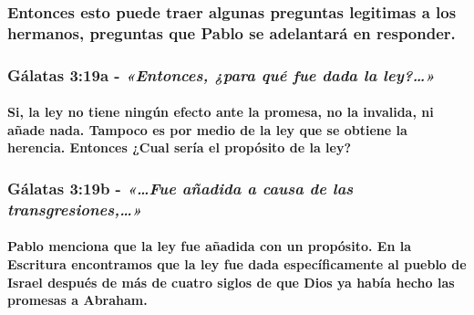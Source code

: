 \documentclass[11a pt,twoside]{article}
\newcommand{\scripture}[1]{%
  {\fontsize{12pt}{16pt}\selectfont\ScriptureFont\itshape #1}%
}
\let\oldsubsubsection\subsubsection
\renewcommand{\subsubsection}{\needspace{4\baselineskip}\oldsubsubsection}
\let\oldparagraph\paragraph
\renewcommand{\paragraph}{\needspace{3\baselineskip}\oldparagraph}
\begin{document}
\subsubsection{Entonces esto puede traer algunas preguntas legitimas a
los hermanos, preguntas que Pablo se adelantará en
responder.}\label{entonces-esto-puede-traer-algunas-preguntas-legitimas-a-los-hermanos-preguntas-que-pablo-se-adelantaruxe1-en-responder.}

\subsubsection{\texorpdfstring{Gálatas 3:19a -
\scripture{«Entonces, ¿para qué fue dada la ley?…»}}{Gálatas 3:19a - }}\label{guxe1latas-319a---entonces-para-quuxe9-fue-dada-la-ley}

\paragraph{Si, la ley no tiene ningún efecto ante la promesa, no la
invalida, ni añade nada. Tampoco es por medio de la ley que se obtiene
la herencia. Entonces ¿Cual sería el propósito de la
ley?}\label{si-la-ley-no-tiene-ninguxfan-efecto-ante-la-promesa-no-la-invalida-ni-auxf1ade-nada.-tampoco-es-por-medio-de-la-ley-que-se-obtiene-la-herencia.-entonces-cual-seruxeda-el-propuxf3sito-de-la-ley}

\subsubsection{\texorpdfstring{Gálatas 3:19b -
\scripture{«…Fue añadida a causa de las transgresiones,…»}}{Gálatas 3:19b - }}\label{guxe1latas-319b---fue-auxf1adida-a-causa-de-las-transgresiones}

\paragraph{Pablo menciona que la ley fue añadida con un propósito. En la
Escritura encontramos que la ley fue dada específicamente al pueblo de
Israel después de más de cuatro siglos de que Dios ya había hecho las
promesas a
Abraham.}\label{pablo-menciona-que-la-ley-fue-auxf1adida-con-un-propuxf3sito.-en-la-escritura-encontramos-que-la-ley-fue-dada-especuxedficamente-al-pueblo-de-israel-despuuxe9s-de-muxe1s-de-cuatro-siglos-de-que-dios-ya-habuxeda-hecho-las-promesas-a-abraham.}
\end{document}
